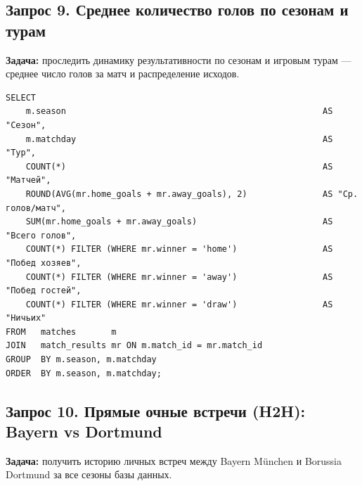 \documentclass[14pt,a4paper]{extarticle}
\begin{document}
\subsection{Запрос 9. Среднее количество голов по сезонам и турам}

\textbf{Задача:} проследить динамику результативности по сезонам и игровым
турам — среднее число голов за матч и распределение исходов.

\begin{listing}[H]
\caption{Среднее число голов по сезонам и турам}
\begin{verbatim}
SELECT
    m.season                                                   AS "Сезон",
    m.matchday                                                 AS "Тур",
    COUNT(*)                                                   AS "Матчей",
    ROUND(AVG(mr.home_goals + mr.away_goals), 2)               AS "Ср. голов/матч",
    SUM(mr.home_goals + mr.away_goals)                         AS "Всего голов",
    COUNT(*) FILTER (WHERE mr.winner = 'home')                 AS "Побед хозяев",
    COUNT(*) FILTER (WHERE mr.winner = 'away')                 AS "Побед гостей",
    COUNT(*) FILTER (WHERE mr.winner = 'draw')                 AS "Ничьих"
FROM   matches       m
JOIN   match_results mr ON m.match_id = mr.match_id
GROUP  BY m.season, m.matchday
ORDER  BY m.season, m.matchday;
\end{verbatim}
\end{listing}

\subsection{Запрос 10. Прямые очные встречи (H2H): Bayern vs Dortmund}

\textbf{Задача:} получить историю личных встреч между Bayern München и
Borussia Dortmund за все сезоны базы данных.
\end{document}
